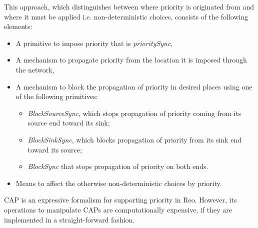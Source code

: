 This approach, which distinguishes between where priority is originated from and where it must be applied i.e. non-deterministic choices, consists of the following elements:

\begin{itemize}
 \item A primitive to impose priority that is \emph{prioritySync},
 \item A mechanism to propagate priority from the location it is imposed through the network,
 \item A mechanism to block the propagation of priority in desired places using one of the following primitives:  
 \begin{itemize}
 \item \emph{BlockSourceSync}, which stops propagation of priority coming from its source end toward its sink;
 \item \emph{BlockSinkSync}, which blocks propagation of priority from its sink end toward its source; 
 \item \emph{BlockSync} that stops propagation of priority on both ends.
 \end{itemize}
\item Means to affect the otherwise non-deterministic choices by priority.
\label{item:prioreq}
\end{itemize}

CAP is an expressive formalism for supporting priority in Reo. However, its operations to manipulate CAPs are computationally expensive, if they are implemented in a straight-forward fashion. %

